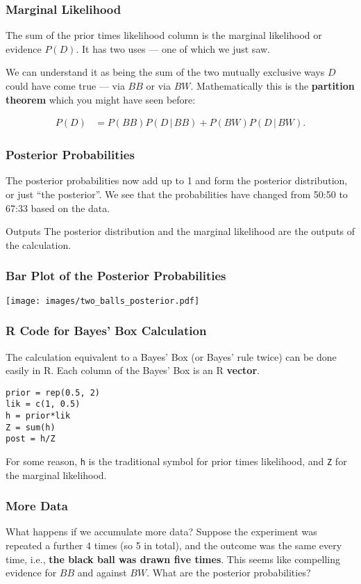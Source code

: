 \documentclass{beamer}
\newcommand{\given}{\,|\,}
\begin{document}
\begin{frame}
\frametitle{Marginal Likelihood}
The sum of the prior times likelihood column is the marginal likelihood
or evidence $P(D)$. It has two uses --- one of which we just saw.\\[0.5em]\pause

We can understand it as being the sum of the two mutually exclusive ways
$D$ could have come true --- via $BB$ or via $BW$. Mathematically this is
the {\bf partition theorem} which you might have seen before:

\begin{align}
P(D) &= P(BB)P(D \given BB) + P(BW)P(D \given BW).
\end{align}
\end{frame}


\begin{frame}
\frametitle{Posterior Probabilities}
The posterior probabilities now add up to 1 and form the posterior distribution,
or just ``the posterior''. We see that the probabilities have changed from
50:50 to 67:33 based on the data.\pause

\begin{alertblock}{Outputs}
The posterior distribution and the marginal likelihood are the outputs of the
calculation.
\end{alertblock}

\end{frame}

\begin{frame}
\frametitle{Bar Plot of the Posterior Probabilities}

\centering
\texttt{[image: images/two\_balls\_posterior.pdf]}

\end{frame}


\begin{frame}[fragile]
\frametitle{R Code for Bayes' Box Calculation}
The calculation equivalent to a Bayes' Box (or Bayes' rule twice) can be
done easily in R. Each column of the Bayes' Box is an R {\bf vector}.\pause

\begin{verbatim}
prior = rep(0.5, 2)
lik = c(1, 0.5)
h = prior*lik
Z = sum(h)
post = h/Z
\end{verbatim}
\pause
For some reason, \texttt{h} is the traditional symbol for prior times
likelihood, and \texttt{Z} for the marginal likelihood.
\end{frame}

\begin{frame}
\frametitle{More Data}
What happens if we accumulate more data? Suppose the experiment was repeated
a further 4 times (so 5 in total), and the outcome was the same every time,
i.e., {\bf the black ball was drawn five times}. This seems like compelling
evidence for $BB$ and against $BW$. What are the posterior probabilities?

\end{frame}
\end{document}
